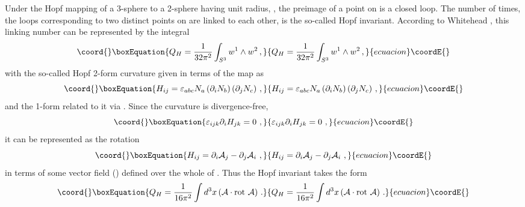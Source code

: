 \documentclass[a4paper,12pt]{article}
\begin{document}
Under the Hopf mapping of a 3-sphere to a 2-sphere having unit radius,
\coordHE{}, the preimage of a point on
\coordHE{} is a closed loop.
The number \coordHE{} of times, the loops corresponding to two distinct points
on \coordHE{} are linked to each other, is the so-called Hopf invariant.
According to Whitehead \cite{Whitehead}, this linking number can be
represented by the integral
\begin{equation}\coord{}\boxEquation{ \label{eq:Hopf}
Q_H = \frac{1}{32\pi^2}\int_{S^3}  w^1 \wedge w^2\,,
}{ Q_H = \frac{1}{32\pi^2}\int_{S^3}  w^1 \wedge w^2\,,
}{ecuacion}\coordE{}\end{equation}
with the so-called Hopf 2-form curvature  \coordHE{}
given in terms of the map \coordHE{} as
\begin{equation}\coord{}\boxEquation{
\label{Hij1}
H_{ij}  = \varepsilon_{abc}N_a
\left( \partial_i N_b\right) \left(\partial_j N_c \right)\,,
}{
H_{ij}  = \varepsilon_{abc}N_a
\left( \partial_i N_b\right) \left(\partial_j N_c \right)\,,
}{ecuacion}\coordE{}\end{equation}
and the 1-form \coordHE{} related to it via \coordHE{}.
Since the curvature \coordHE{} is divergence-free,
\begin{equation}\coord{}\boxEquation{
\varepsilon_{ijk}\partial_{i}H_{jk}=0~,
}{
\varepsilon_{ijk}\partial_{i}H_{jk}=0~,
}{ecuacion}\coordE{}\end{equation}
it can be represented as the rotation
\begin{equation}\coord{}\boxEquation{
\label{Hij2}
H_{ij} =\partial_i \mathcal{A}_j - \partial_j\mathcal{A}_i~,
}{
H_{ij} =\partial_i \mathcal{A}_j - \partial_j\mathcal{A}_i~,
}{ecuacion}\coordE{}\end{equation}
in terms of some vector field \coordHE{} (\coordHE{})
defined over the whole of \coordHE{}.
Thus the Hopf invariant takes the form
\begin{equation}\coord{}\boxEquation{
\label{eq:rot}
Q_{H} = \frac{1}{16\pi^2}\int d^3x
\left( {\mathbf{\mathcal{A}}}\cdot \mbox{rot}\
{\mathbf{\mathcal{A}}} \right)\,.
}{
Q_{H} = \frac{1}{16\pi^2}\int d^3x
\left( {\mathbf{\mathcal{A}}}\cdot \mbox{rot}\
{\mathbf{\mathcal{A}}} \right)\,.
}{ecuacion}\coordE{}\end{equation}
\end{document}
